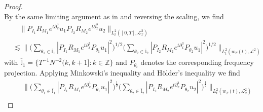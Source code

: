 \documentclass{amsart}
\theoremstyle{definition}
\newcommand{\Z}{\mathbb{Z}}
\begin{document}
\begin{proof}
\begin{equation*}
\end{equation*}
By the same limiting argument as in \cite{Schippa2025Quasiperiodic} and reversing the scaling, we find
\begin{equation*}
\begin{split}
&\quad \| P_{I_1} R_{M_1} e^{t \partial_x^3} u_1 P_{I_2} R_{M_2} e^{t \partial_x^3} u_2 \|_{L^2_t([0,T],\mathcal{L}^2_x)} \\
&\lesssim \big\| \big( \sum_{\theta_1 \in \overline{\mathbb{I}}_1} |P_{I_1} R_{M_1} e^{t \partial_x^3} P_{\theta_1} u_1 |^2 \big)^{1/2} \big( \sum_{\theta_2 \in \overline{\mathbb{I}}_2} | P_{I_2} R_{M_2} e^{t \partial_x^3} P_{\theta_2} u_1 |^2 \big)^{1/2} \big\|_{L^2_t(w_{T}(t),\mathcal{L}^2)}
\end{split}
\end{equation*}
with $\overline{\mathbb{I}}_1 = \{ T^{-1} N^{-2} (k,k+1] : k \in \Z \}$ and $P_{\theta_i}$ denotes the corresponding frequency projection.
Applying Minkowski's inequality and H\"older's inequality we find
\begin{equation*}
\begin{split}
&\quad \| \big( \sum_{\theta_1 \in \overline{\mathbb{I}}_1} |P_{I_1} R_{M_1} e^{t \partial_x^3} P_{\theta_1} u_{1 } |^2 \big)^{\frac{1}{2}} \big( \sum_{\theta_2 \in \overline{\mathbb{I}}_2} |P_{I_2} R_{M_2} e^{t \partial_x^3} P_{\theta_2} u_{2} |^2 \big)^{\frac{1}{2}} \big\|_{L^2_t(w_{T}(t), \mathcal{L}^2_x)} \\

\end{split}
\end{equation*}
\end{proof}
\end{document}
